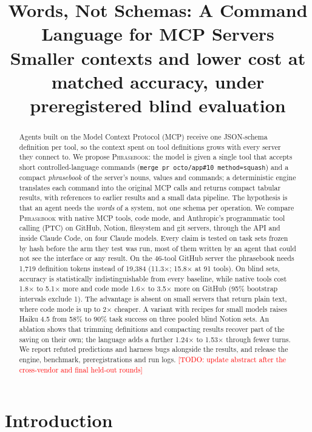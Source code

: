 \documentclass[11pt]{article}
\title{Words, Not Schemas: A Command Language for MCP Servers\\
\large Smaller contexts and lower cost at matched accuracy, under preregistered blind evaluation}
\author{\todo{author names, affiliations, emails}}
\date{\todo{date of submission}}
\newcommand{\todo}[1]{\textcolor{red}{[TODO: #1]}}
\newcommand{\pb}{\textsc{Phrasebook}}
\begin{document}
\maketitle

\begin{abstract}
Agents built on the Model Context Protocol (MCP) receive one JSON-schema definition per tool, so the context spent on tool definitions grows with every server they connect to. We propose \pb{}: the model is given a single tool that accepts short controlled-language commands (\texttt{merge pr octo/app\#10 method=squash}) and a compact \emph{phrasebook} of the server's nouns, values and commands; a deterministic engine translates each command into the original MCP calls and returns compact tabular results, with references to earlier results and a small data pipeline. The hypothesis is that an agent needs the \emph{words} of a system, not one schema per operation. We compare \pb{} with native MCP tools, code mode, and Anthropic's programmatic tool calling (PTC) on GitHub, Notion, filesystem and git servers, through the API and inside Claude Code, on four Claude models. Every claim is tested on task sets frozen by hash before the arm they test was run, most of them written by an agent that could not see the interface or any result. On the 46-tool GitHub server the phrasebook needs 1,719 definition tokens instead of 19,384 (11.3$\times$; 15.8$\times$ at 91 tools). On blind sets, accuracy is statistically indistinguishable from every baseline, while native tools cost 1.8$\times$ to 5.1$\times$ more and code mode 1.6$\times$ to 3.5$\times$ more on GitHub (95\% bootstrap intervals exclude 1). The advantage is absent on small servers that return plain text, where code mode is up to 2$\times$ cheaper. A variant with recipes for small models raises Haiku 4.5 from 58\% to 90\% task success on three pooled blind Notion sets. An ablation shows that trimming definitions and compacting results recover part of the saving on their own; the language adds a further 1.24$\times$ to 1.53$\times$ through fewer turns. We report refuted predictions and harness bugs alongside the results, and release the engine, benchmark, preregistrations and run logs.
\todo{update abstract after the cross-vendor and final held-out rounds}
\end{abstract}

\section{Introduction}
\end{document}
